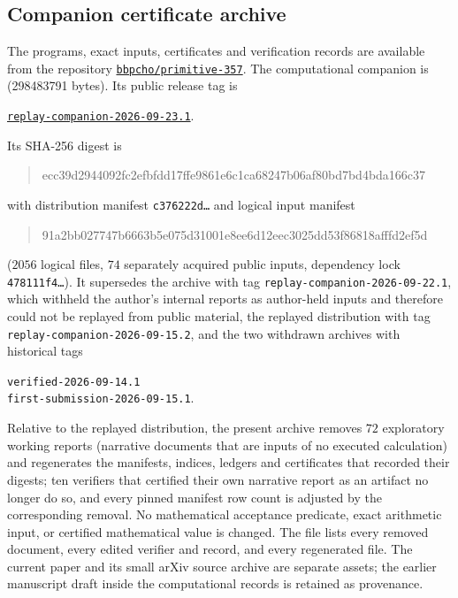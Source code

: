 \documentclass[11pt]{article}
\theoremstyle{definition}
\theoremstyle{remark}
\begin{document}
\subsection{Companion certificate archive}

The programs, exact inputs, certificates and verification records
are available from the repository
\href{https://github.com/bbpcho/primitive-357}{\texttt{bbpcho/primitive-357}}.
The computational companion is
(298483791 bytes). Its public release tag is
\begin{center}
\href{https://github.com/bbpcho/primitive-357/releases/tag/replay-companion-2026-09-23.1}{\texttt{replay-companion-2026-09-23.1}}.
\end{center}
Its SHA-256 digest is
\begin{quote}\small\ttfamily
ecc39d2944092fc2efbfdd17ffe9861e6c1ca68247b06af80bd7bd4bda166c37
\end{quote}
with distribution manifest \texttt{c376222d\ldots} and logical input
manifest
\begin{quote}\small\ttfamily
91a2bb027747b6663b5e075d31001e8ee6d12eec3025dd53f86818afffd2ef5d
\end{quote}
($2056$ logical files, $74$ separately acquired public inputs,
dependency lock \texttt{478111f4\ldots}).
It supersedes the archive with tag \texttt{replay-companion-2026-09-22.1},
which withheld the author's internal reports as author-held inputs and
therefore could not be replayed from public material, the replayed
distribution with tag \texttt{replay-companion-2026-09-15.2}, and the
two withdrawn archives with historical tags
\begin{center}\small
\texttt{verified-2026-09-14.1}\\
\texttt{first-submission-2026-09-15.1}.
\end{center}
Relative to the replayed distribution, the present archive removes
$72$ exploratory working reports (narrative documents that are inputs
of no executed calculation) and regenerates the manifests, indices,
ledgers and certificates that recorded their digests; ten verifiers
that certified their own narrative report as an artifact no longer do
so, and every pinned manifest row count is adjusted by the
corresponding removal.  No mathematical acceptance predicate, exact
arithmetic input, or certified mathematical value is changed.  The file  lists
every removed document, every edited verifier and record, and every
regenerated file.  The current paper and its small arXiv source
archive are separate assets; the earlier manuscript draft inside the
computational records is retained as provenance.
\end{document}
